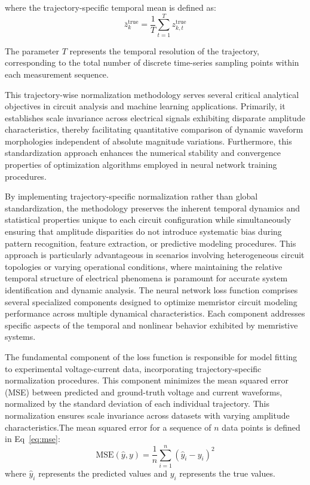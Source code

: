 \documentclass[11pt, oneside]{article}
\begin{document}
where the trajectory-specific temporal mean is defined as:
\begin{equation}
    \bar{z}_k^{\mathrm{true}} = \frac{1}{T} \sum_{t=1}^{T} z_{k,t}^{\mathrm{true}}
\end{equation}

The parameter $T$ represents the temporal resolution of the trajectory, corresponding to the total number of discrete time-series sampling points within each measurement sequence.

This trajectory-wise normalization methodology serves several critical analytical objectives in circuit analysis and machine learning applications. Primarily, it establishes scale invariance across electrical signals exhibiting disparate amplitude characteristics, thereby facilitating quantitative comparison of dynamic waveform morphologies independent of absolute magnitude variations. Furthermore, this standardization approach enhances the numerical stability and convergence properties of optimization algorithms employed in neural network training procedures.

By implementing trajectory-specific normalization rather than global standardization, the methodology preserves the inherent temporal dynamics and statistical properties unique to each circuit configuration while simultaneously ensuring that amplitude disparities do not introduce systematic bias during pattern recognition, feature extraction, or predictive modeling procedures. This approach is particularly advantageous in scenarios involving heterogeneous circuit topologies or varying operational conditions, where maintaining the relative temporal structure of electrical phenomena is paramount for accurate system identification and dynamic analysis.
The neural network loss function comprises several specialized components designed to optimize memristor circuit modeling performance across multiple dynamical characteristics. Each component addresses specific aspects of the temporal and nonlinear behavior exhibited by memristive systems.

The fundamental component of the loss function is responsible for model fitting to experimental voltage-current data, incorporating trajectory-specific normalization procedures. This component minimizes the mean squared error (MSE) between predicted and ground-truth voltage and current waveforms, normalized by the standard deviation of each individual trajectory. This normalization ensures scale invariance across datasets with varying amplitude characteristics.The mean squared error for a sequence of $n$ data points is defined in Eq~\eqref{eq:mse}:
\begin{equation}
    \mathrm{MSE}(\hat{y}, y) = \frac{1}{n} \sum_{i=1}^{n} (\hat{y}_i - y_i)^2
    \label{eq:mse}
\end{equation}
where $\hat{y}_i$ represents the predicted values and $y_i$ represents the true values.
\end{document}

